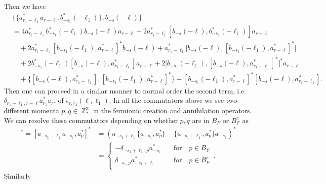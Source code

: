 \documentclass[sn-mathphys, Numbered ,a4paper]{sn-jnl}%
\DeclareMathOperator{\Z}{\mathbb{Z}}
\theoremstyle{plain}
\theoremstyle{definition}
\theoremstyle{remark}
\theoremstyle{plain}
\theoremstyle{definition}
\theoremstyle{remark}
\begin{document}
Then we have
\begin{align}
    &\big\{\{a^*_{r_1-\ell_1}a_{r-\ell}, b^*_{-s_1}(-\ell_1)\},b_{-s}(-\ell)\big\}\nonumber\\
    &= 4a^*_{  r_1-\ell_1}b^*_{-s_1}(-\ell_1)b_{-s}(-\ell)a_{ r-\ell} + 2a^*_{  r_1-\ell_1}[b_{-s}(-\ell),b^*_{-s_1}(-\ell_1)]a_{ r-\ell}\nonumber\\ 
    &\quad + 2a^*_{r_1-\ell_1}[b_{-s_1}(-\ell_1),a^*_{ r-\ell}]^*b_{-s}(-\ell) + a^*_{  r_1-\ell_1}\big[b_{-s}(-\ell),[b_{-s_1}(-\ell_1),a^*_{ r-\ell}]^*\big]\nonumber\\
    &\quad + 2b^*_{-s_1}(-\ell_1)[b_{-s}(-\ell),a^*_{  r_1-\ell_1}]a_{ r-\ell} +2\big[b_{-s_1}(-\ell_1),[b_{-s}(-\ell),a^*_{  r_1-\ell_1}]^*\big]^*a_{ r-\ell}\nonumber\\
    &\quad + \big\{ [b_{-s}(-\ell),a^*_{  r_1-\ell_1}],[b_{-s_1}(-\ell_1), a^*_{ r-\ell}]^* \big\} - [ b_{-s_1}(-\ell_1), a^*_{ r-\ell}]^* [b_{-s}(-\ell), a^*_{r_1-\ell_1}].\label{eq:no2comm}
\end{align}
Then one can proceed in a similar manner to normal order the second term, i.e. $\delta_{r_1-\ell_1,r-\ell}a^*_{r_1}a_{r}$, of $\epsilon_{r,r_1}(\ell, \ell_1)$. In all the commutators above we see two different momenta $p,q \in \Z^3_*$ in the fermionic creation and annihilation operators. We can resolve these commutators depending on whether $p,q$ are in $B_{F}$ or $B_{F}^c$ as 
\begin{align}
	[b_{-s_1}(-\ell_1), a^*_{p}]^* = [a_{-s_1+\ell_1}a_{-s_1}, a^*_{p}]^* &=\left(a_{-s_1+\ell_1}\{a_{-s_1}, a^*_{p}\}-\{a_{-s_1+\ell_1}, a^*_{p}\}a_{-s_1} \right)^*\nonumber\\ 
	&=\begin{cases}
		-\delta_{-s_1+\ell_1,p}a^*_{-s_1} \quad&\text{for}\quad p \in B_F\\
		\delta_{-s_1,p}a^*_{-s_1+\ell_1} \quad&\text{for}\quad p \in B^c_F\\
	\end{cases}\label{eq:comm1}\,.
\end{align}
Similarly
\end{document}
